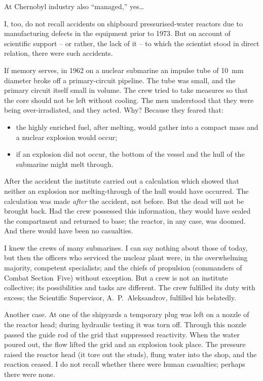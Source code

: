 \documentclass[openright]{bookest}
\begin{document}
At Chernobyl industry also ``managed,'' yes\ldots

I, too, do not recall accidents on shipboard pressurised-water reactors due to manufacturing defects in the equipment prior to 1973. But on account of scientific support -- or rather, the lack of it -- to which the scientist stood in direct relation, there were such accidents.

If memory serves, in 1962 on a nuclear submarine an impulse tube of \qty{10}{\milli\metre} diameter broke off a primary-circuit pipeline. The tube was small, and the primary circuit itself small in volume. The crew tried to take measures so that the core should not be left without cooling. The men understood that they were being over-irradiated, and they acted. Why? Because they feared that:

\begin{itemize}
\item the highly enriched fuel, after melting, would gather into a compact mass and a nuclear explosion would occur;
\item if an explosion did not occur, the bottom of the vessel and the hull of the submarine might melt through.
\end{itemize}

After the accident the institute carried out a calculation which showed that neither an explosion nor melting-through of the hull would have occurred. The calculation was made \textit{after} the accident, not before. But the dead will not be brought back. Had the crew possessed this information, they would have sealed the compartment and returned to base; the reactor, in any case, was doomed. And there would have been no casualties.

I knew the crews of many submarines. I can say nothing about those of today, but then the officers who serviced the nuclear plant were, in the overwhelming majority, competent specialists; and the chiefs of propulsion (commanders of Combat Section~Five) without exception. But a crew is not an institute collective; its possibilities and tasks are different. The crew fulfilled its duty with excess; the Scientific Supervisor, A.~P.~Aleksandrov, fulfilled his belatedly.


Another case. At one of the shipyards a temporary plug was left on a nozzle of the reactor head; during hydraulic testing it was torn off. Through this nozzle passed the guide rod of the grid that suppressed reactivity. When the water poured out, the flow lifted the grid and an explosion took place. The pressure raised the reactor head (it tore out the studs), flung water into the shop, and the reaction ceased. I do not recall whether there were human casualties; perhaps there were none.
\end{document}

